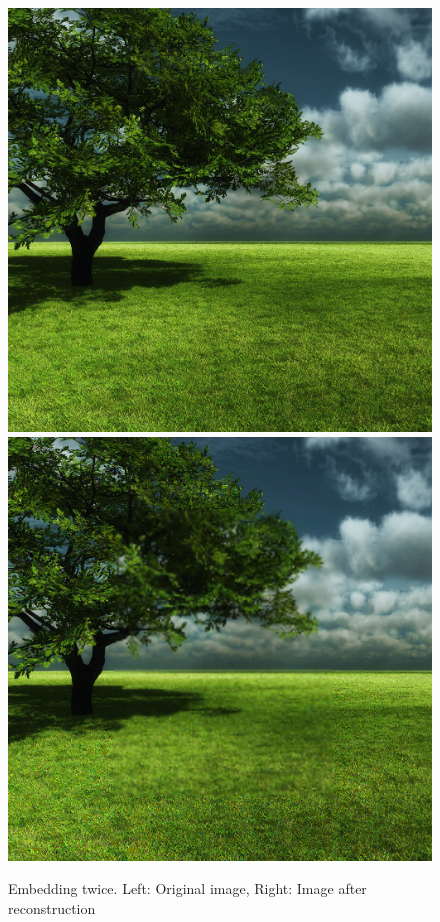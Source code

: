\documentclass[12pt]{article}
\begin{document}
\begin{figure}[h]
\centerline{%
\includegraphics[scale=0.3375]{"tree"}%
\hspace{0.1cm}
\includegraphics[scale=0.45]{"Tree Embed twice 0.8 threshold/finalImageAfterRestoration"}%
}%
\caption{Embedding twice. Left: Original image, Right: Image after reconstruction}
\label{fig:treeEmbedTwiceRestore}
\end{figure}
\end{document}
